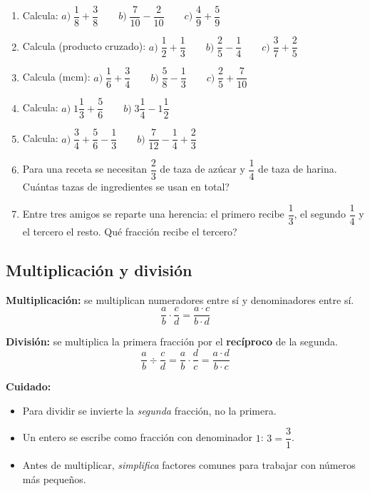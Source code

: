 \documentclass[12pt, letterpaper]{article}
\begin{document}
\begin{enumerate}[leftmargin=*]
  \item \facil{} Calcula: $a)\; \dfrac{1}{8} + \dfrac{3}{8} \qquad b)\; \dfrac{7}{10} - \dfrac{2}{10} \qquad c)\; \dfrac{4}{9} + \dfrac{5}{9}$

  \item \facil{} Calcula (producto cruzado): $a)\; \dfrac{1}{2} + \dfrac{1}{3} \qquad b)\; \dfrac{2}{5} - \dfrac{1}{4} \qquad c)\; \dfrac{3}{7} + \dfrac{2}{5}$

  \item \facil{} Calcula (mcm): $a)\; \dfrac{1}{6} + \dfrac{3}{4} \qquad b)\; \dfrac{5}{8} - \dfrac{1}{3} \qquad c)\; \dfrac{2}{5} + \dfrac{7}{10}$

  \item \medio{} Calcula: $a)\; 1\dfrac{1}{3} + \dfrac{5}{6} \qquad b)\; 3\dfrac{1}{4} - 1\dfrac{1}{2}$

  \item \medio{} Calcula: $a)\; \dfrac{3}{4} + \dfrac{5}{6} - \dfrac{1}{3} \qquad b)\; \dfrac{7}{12} - \dfrac{1}{4} + \dfrac{2}{3}$

  \item \medio{} Para una receta se necesitan $\dfrac{2}{3}$ de taza de azúcar y $\dfrac{1}{4}$ de taza de harina. \textquestiondown Cuántas tazas de ingredientes se usan en total?

  \item \dificil{} Entre tres amigos se reparte una herencia: el primero recibe $\dfrac{1}{3}$, el segundo $\dfrac{1}{4}$ y el tercero el resto. \textquestiondown Qué fracción recibe el tercero?
\end{enumerate}

\subsection{Multiplicación y división}

\begin{cuadroteoria}
  \textbf{Multiplicación:} se multiplican numeradores entre sí y denominadores entre sí.
  \[
    \frac{a}{b} \cdot \frac{c}{d} = \frac{a \cdot c}{b \cdot d}
  \]

  \textbf{División:} se multiplica la primera fracción por el \textbf{recíproco} de la segunda.
  \[
    \frac{a}{b} \div \frac{c}{d} = \frac{a}{b} \cdot \frac{d}{c} = \frac{a \cdot d}{b \cdot c}
  \]
\end{cuadroteoria}

\begin{cuadroadvertencia}
  \textbf{Cuidado:}
  \begin{itemize}[leftmargin=*]
    \item Para dividir se invierte la \emph{segunda} fracción, no la primera.
    \item Un entero se escribe como fracción con denominador $1$: $3 = \dfrac{3}{1}$.
    \item Antes de multiplicar, \emph{simplifica} factores comunes para trabajar con números más pequeños.
  \end{itemize}
\end{cuadroadvertencia}
\end{document}

